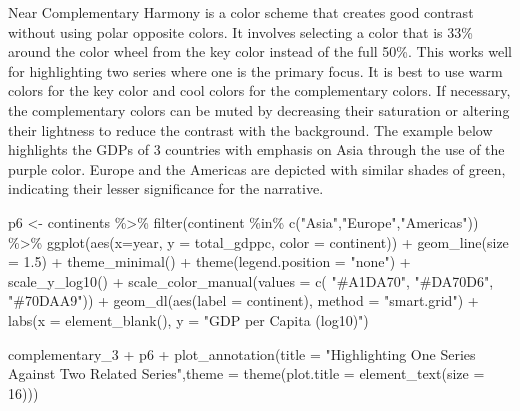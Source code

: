 \documentclass[
  letterpaper,
]{book}
\newenvironment{Shaded}{\begin{snugshade}}{\end{snugshade}}
\newcommand{\AttributeTok}[1]{\textcolor[rgb]{0.40,0.45,0.13}{#1}}
\newcommand{\DecValTok}[1]{\textcolor[rgb]{0.68,0.00,0.00}{#1}}
\newcommand{\FloatTok}[1]{\textcolor[rgb]{0.68,0.00,0.00}{#1}}
\newcommand{\FunctionTok}[1]{\textcolor[rgb]{0.28,0.35,0.67}{#1}}
\newcommand{\NormalTok}[1]{\textcolor[rgb]{0.00,0.23,0.31}{#1}}
\newcommand{\OtherTok}[1]{\textcolor[rgb]{0.00,0.23,0.31}{#1}}
\newcommand{\SpecialCharTok}[1]{\textcolor[rgb]{0.37,0.37,0.37}{#1}}
\newcommand{\StringTok}[1]{\textcolor[rgb]{0.13,0.47,0.30}{#1}}
\begin{document}
Near Complementary Harmony is a color scheme that creates good contrast
without using polar opposite colors. It involves selecting a color that
is 33\% around the color wheel from the key color instead of the full
50\%. This works well for highlighting two series where one is the
primary focus. It is best to use warm colors for the key color and cool
colors for the complementary colors. If necessary, the complementary
colors can be muted by decreasing their saturation or altering their
lightness to reduce the contrast with the background. The example below
highlights the GDPs of 3 countries with emphasis on Asia through the use
of the purple color. Europe and the Americas are depicted with similar
shades of green, indicating their lesser significance for the narrative.

\begin{Shaded}
\begin{Highlighting}[]
\NormalTok{p6 }\OtherTok{\textless{}{-}}\NormalTok{ continents }\SpecialCharTok{\%\textgreater{}\%} 
  \FunctionTok{filter}\NormalTok{(continent }\SpecialCharTok{\%in\%} \FunctionTok{c}\NormalTok{(}\StringTok{"Asia"}\NormalTok{,}\StringTok{"Europe"}\NormalTok{,}\StringTok{"Americas"}\NormalTok{)) }\SpecialCharTok{\%\textgreater{}\%} 
  \FunctionTok{ggplot}\NormalTok{(}\FunctionTok{aes}\NormalTok{(}\AttributeTok{x=}\NormalTok{year, }\AttributeTok{y =}\NormalTok{ total\_gdppc, }\AttributeTok{color =}\NormalTok{ continent)) }\SpecialCharTok{+} 
  \FunctionTok{geom\_line}\NormalTok{(}\AttributeTok{size =} \FloatTok{1.5}\NormalTok{) }\SpecialCharTok{+} 
  \FunctionTok{theme\_minimal}\NormalTok{() }\SpecialCharTok{+} 
  \FunctionTok{theme}\NormalTok{(}\AttributeTok{legend.position =} \StringTok{"none"}\NormalTok{) }\SpecialCharTok{+}
  \FunctionTok{scale\_y\_log10}\NormalTok{() }\SpecialCharTok{+}
  \FunctionTok{scale\_color\_manual}\NormalTok{(}\AttributeTok{values =} \FunctionTok{c}\NormalTok{( }\StringTok{"\#A1DA70"}\NormalTok{, }\StringTok{"\#DA70D6"}\NormalTok{, }\StringTok{"\#70DAA9"}\NormalTok{)) }\SpecialCharTok{+}
  \FunctionTok{geom\_dl}\NormalTok{(}\FunctionTok{aes}\NormalTok{(}\AttributeTok{label =}\NormalTok{ continent), }\AttributeTok{method =} \StringTok{"smart.grid"}\NormalTok{) }\SpecialCharTok{+}
  \FunctionTok{labs}\NormalTok{(}\AttributeTok{x =} \FunctionTok{element\_blank}\NormalTok{(), }\AttributeTok{y =} \StringTok{"GDP per Capita (log10)"}\NormalTok{)}

\NormalTok{complementary\_3 }\SpecialCharTok{+}\NormalTok{ p6 }\SpecialCharTok{+} \FunctionTok{plot\_annotation}\NormalTok{(}\AttributeTok{title =} \StringTok{"Highlighting One Series Against Two Related Series"}\NormalTok{,}\AttributeTok{theme =} \FunctionTok{theme}\NormalTok{(}\AttributeTok{plot.title =} \FunctionTok{element\_text}\NormalTok{(}\AttributeTok{size =} \DecValTok{16}\NormalTok{)))}
\end{Highlighting}
\end{Shaded}
\end{document}
